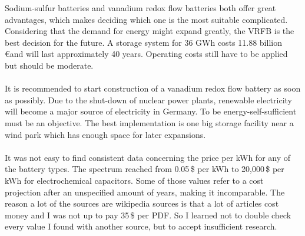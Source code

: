 \begin{parcolumns}[colwidths={1=2.5 cm, 2=10 cm, 3=2.5cm}]{3}
{Sodium-sulfur batteries and vanadium redox flow batteries both offer great advantages, which makes deciding which one is the most suitable complicated. Considering that the demand for energy might expand greatly, the VRFB is the best decision for the future. A storage system for 36 GWh costs 11.88 billion \euro and will last approximately  40 years. Operating costs still have to be applied but should be moderate.\\\\
It is recommended to start construction of a vanadium redox flow battery as soon as possibly. Due to the shut-down of nuclear power plants, renewable electricity will become  a major source of electricity in Germany. To be energy-self-sufficient must be an objective. The best implementation is one big storage facility near a wind park which has enough space for later expansions. \\\\
It was not easy to find consistent data concerning the price per kWh for any of the battery types. The spectrum reached from 0.05\,\$ per kWh to 20,000\,\$ per kWh for electrochemical capacitors. Some of those values refer to a cost projection after an unspecified amount of years, making it incomparable. The reason a lot of the sources are wikipedia sources is that a lot of articles cost money and I was not up to pay 35\,\$ per PDF. So I learned not to double check every value I found with another source, but to accept insufficient research.


}


\end{parcolumns}
